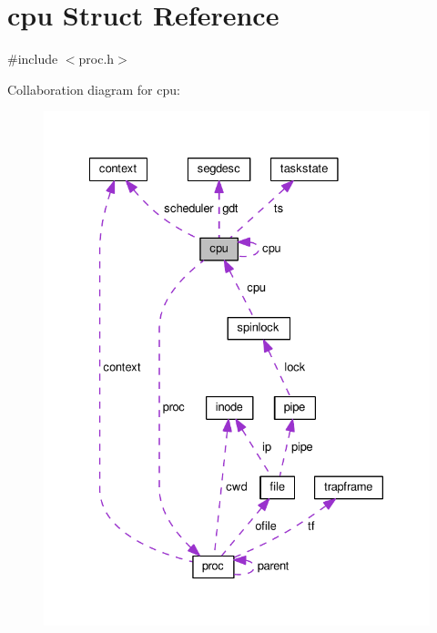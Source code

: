 \hypertarget{structcpu}{\section{cpu Struct Reference}
\label{structcpu}
}


{\ttfamily \#include $<$proc.\-h$>$}



Collaboration diagram for cpu\-:
\nopagebreak
\begin{figure}[H]
\begin{center}
\leavevmode
\includegraphics[width=330pt]{structcpu__coll__graph}
\end{center}
\end{figure}
